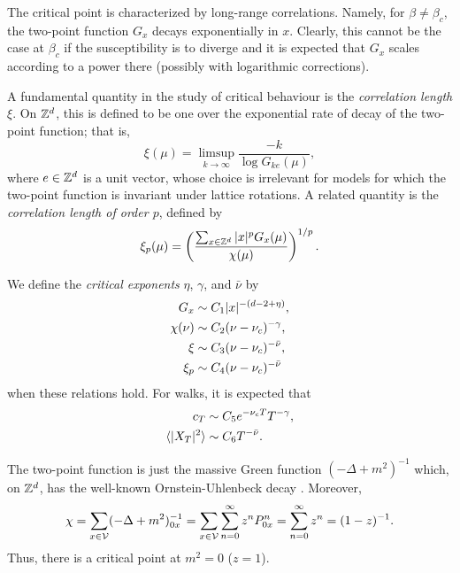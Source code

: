The critical point is characterized by long-range correlations. Namely, for
$\beta \ne \beta_c$, the two-point function $G_x$ decays exponentially in $x$. Clearly, this cannot be the case at $\beta_c$ if the susceptibility is to diverge and it is expected that $G_x$ scales according to a power there 
(possibly with logarithmic corrections).

A fundamental quantity in the study of critical behaviour is the
\emph{correlation length} $\xi$. On ${ {{\mathbb Z}}^d }$, this is defined to be one over the exponential rate of decay of the two-point function; that is,
\begin{equation}
\xi(\mu) = \limsup_{k\to\infty} \frac{-k}{\log G_{ke}(\mu)},
\end{equation}
where $e \in { {{\mathbb Z}}^d }$ is a unit vector, whose choice is irrelevant for models for which the two-point function is invariant under lattice rotations.
A related quantity is the \emph{correlation length of order $p$}, defined by
\begin{equation}
\xi_p(\mu) = \left(\frac{\sum_{x\in{ {{\mathbb Z}}^d }} |x|^p G_x(\mu)}{\chi(\mu)}\right)^{1/p}.
\end{equation}

We define the \emph{critical exponents} $\eta$, $\gamma$, and $\bar\nu$ by
\begin{align}
G_x       &\sim C_1 |x|^{-(d - 2 + \eta)}, \\
\chi(\nu) &\sim C_2 (\nu - \nu_c)^{-\gamma}, \\
\xi       &\sim C_3 (\nu - \nu_c)^{-\bar\nu}, \\
\xi_p     &\sim C_4 (\nu - \nu_c)^{-\bar\nu}
\end{align}
when these relations hold. For walks, it is expected that
\begin{align}
c_T                       &\sim C_5 e^{-\nu_c T} T^{-\gamma}, \\
\langle |X_T|^2 \rangle   &\sim C_6 T^{-\bar\nu}.
\end{align}

\begin{example}
The two-point function is just the massive Green function
$(-\Delta + m^2)^{-1}$ which, on ${ {{\mathbb Z}}^d }$, has the well-known Ornstein-Uhlenbeck decay . Moreover,
\begin{equation}
\chi
  =
\sum_{x\in\mathcal{V}} (-\Delta + m^2)^{-1}_{0x}
  =
\sum_{x\in\mathcal{V}} \sum_{n=0}^\infty z^n P^n_{0x}
  =
\sum_{n=0}^\infty z^n
  =
(1 - z)^{-1}.
\end{equation}
Thus, there is a critical point at $m^2 = 0$ ($z = 1$).

\end{example}

